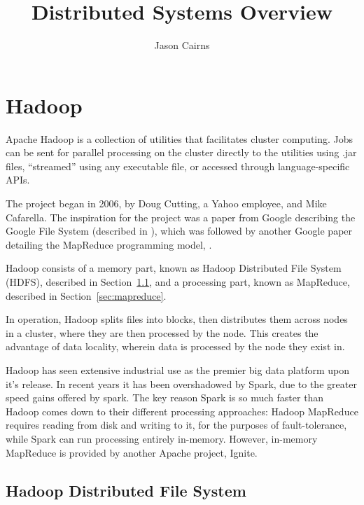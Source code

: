 \documentclass[10pt,a4paper]{article}
\begin{document}
\title{Distributed Systems Overview}
\author{Jason Cairns}
\maketitle{}

\tableofcontents{}

\section{Hadoop}
\label{sec:hadoop-1}

Apache Hadoop is a collection of utilities that facilitates cluster
computing. Jobs can be sent for parallel processing on the cluster
directly to the utilities using .jar files, ``streamed'' using any
executable file, or accessed through language-specific APIs.

The project began in 2006, by Doug Cutting, a Yahoo employee, and Mike
Cafarella. The inspiration for the project was a paper from Google
describing the Google File System (described in
\textcite{ghemawat2003google}), which was followed by another Google
paper detailing the MapReduce programming model,
\textcite{dean2004mapreduce}.

Hadoop consists of a memory part, known as Hadoop Distributed File
System (HDFS), described in Section~\ref{sec:hdfs}, and a processing part,
known as MapReduce, described in Section~\ref{sec:mapreduce}.

In operation, Hadoop splits files into blocks, then distributes them
across nodes in a cluster, where they are then processed by the node.
This creates the advantage of data locality, wherein data is processed
by the node they exist in.

Hadoop has seen extensive industrial use as the premier big data
platform upon it's release. In recent years it has been overshadowed
by Spark, due to the greater speed gains offered by spark. The key
reason Spark is so much faster than Hadoop comes down to their
different processing approaches: Hadoop MapReduce requires reading
from disk and writing to it, for the purposes of fault-tolerance,
while Spark can run processing entirely in-memory. However, in-memory
MapReduce is provided by another Apache project,
Ignite\cite{zheludkov2017high}.


\subsection{Hadoop Distributed File System}
\label{sec:hdfs}
\end{document}
